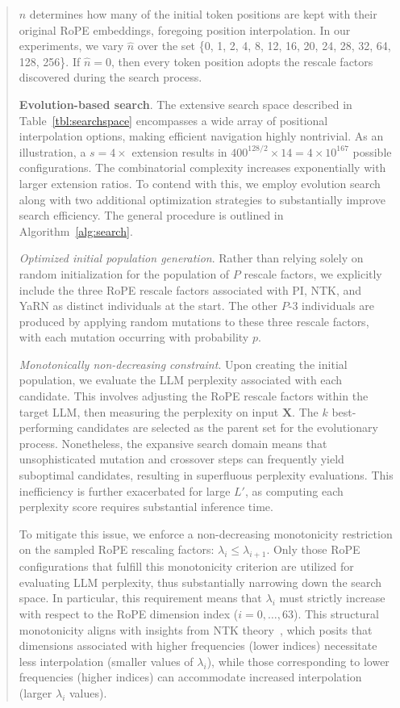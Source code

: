 \begin{abstract}
$\hat{n}$ determines how many of the initial token positions are kept with their original RoPE embeddings, foregoing position interpolation. In our experiments, we vary $\hat{n}$ over the set \{0, 1, 2, 4, 8, 12, 16, 20, 24, 28, 32, 64, 128, 256\}. If $\hat{n}=0$, then every token position adopts the rescale factors discovered during the search process.

\textbf{Evolution-based search}. The extensive search space described in Table~\ref{tbl:searchspace} encompasses a wide array of positional interpolation options, making efficient navigation highly nontrivial. As an illustration, a $s=4\times$ extension results in $400^{128/2}\times14 = 4\times10^{167}$ possible configurations. The combinatorial complexity increases exponentially with larger extension ratios. To contend with this, we employ evolution search~\cite{guo2020single} along with two additional optimization strategies to substantially improve search efficiency. The general procedure is outlined in Algorithm~\ref{alg:search}.

\textit{Optimized initial population generation}. Rather than relying solely on random initialization for the population of $P$ rescale factors, we explicitly include the three RoPE rescale factors associated with PI, NTK, and YaRN as distinct individuals at the start. The other $P$-3 individuals are produced by applying random mutations to these three rescale factors, with each mutation occurring with probability $p$.

\textit{Monotonically non-decreasing constraint}. Upon creating the initial population, we evaluate the LLM perplexity associated with each candidate. This involves adjusting the RoPE rescale factors within the target LLM, then measuring the perplexity on input $\mathbf{X}$. The $k$ best-performing candidates are selected as the parent set for the evolutionary process. Nonetheless, the expansive search domain means that unsophisticated mutation and crossover steps can frequently yield suboptimal candidates, resulting in superfluous perplexity evaluations. This inefficiency is further exacerbated for large $L'$, as computing each perplexity score requires substantial inference time.

To mitigate this issue, we enforce a non-decreasing monotonicity restriction on the sampled RoPE rescaling factors: $\lambda_i\le \lambda_{i+1}$. Only those RoPE configurations that fulfill this monotonicity criterion are utilized for evaluating LLM perplexity, thus substantially narrowing down the search space. In particular, this requirement means that $\lambda_i$ must strictly increase with respect to the RoPE dimension index ($i=0,\ldots,63$). This structural monotonicity aligns with insights from NTK theory~\cite{jacot2018neural,tancik2020fourier,ntk}, which posits that dimensions associated with higher frequencies (lower indices) necessitate less interpolation (smaller values of $\lambda_i$), while those corresponding to lower frequencies (higher indices) can accommodate increased interpolation (larger $\lambda_i$ values).


\end{abstract}
